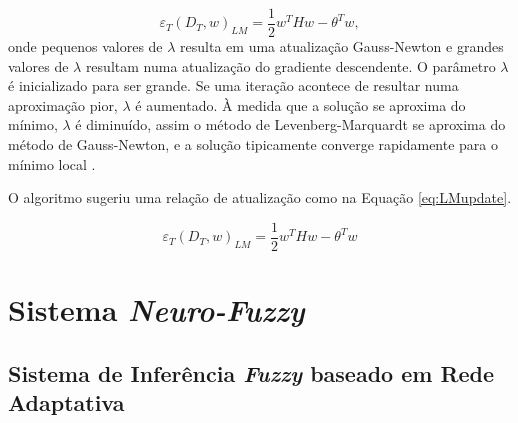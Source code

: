 \begin{equation}
\label{eq:scg}
\varepsilon_T(D_T,w)_{LM} = \frac{1}{2}w^THw - \theta^Tw,
\end{equation}
onde pequenos valores de $\lambda$ resulta em uma atualização Gauss-Newton e grandes valores de $\lambda$ resultam numa atualização do gradiente descendente. O parâmetro $\lambda$ é inicializado para ser grande. Se uma iteração acontece de resultar numa aproximação pior, $\lambda$ é aumentado. À medida que a solução se aproxima do mínimo, $\lambda$ é diminuído, assim o método de Levenberg-Marquardt se aproxima do método de Gauss-Newton, e a solução tipicamente converge rapidamente para o mínimo local \cite{marquardt1963algorithm}.

O algoritmo sugeriu uma relação de atualização como na Equação \ref{eq:LMupdate}.

\begin{equation}
\label{eq:LMupdate}
\varepsilon_T(D_T,w)_{LM} = \frac{1}{2}w^THw - \theta^Tw
\end{equation}

\section{Sistema \textit{Neuro-Fuzzy}}

\subsection{Sistema de Inferência \textit{Fuzzy} baseado em Rede Adaptativa}

